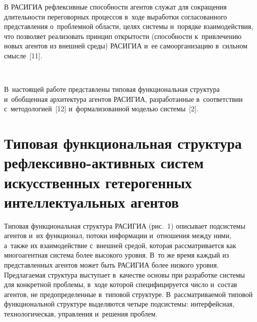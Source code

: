 \begin{multicols}{2}
{}
  
  В РАСИГИА рефлексивные способности агентов служат для сокращения 
дли\-тель\-ности переговорных процессов в~ходе выработки согласованного 
пред\-став\-ле\-ния о~проб\-лем\-ной об\-ласти, целях сис\-те\-мы и~порядке 
взаимодействия, что поз\-во\-ля\-ет реализовать принцип от\-кры\-тости (способности 
к~привлечению новых агентов из внеш\-ней среды) \mbox{РАСИГИА} и~ее 
самоорганизацию в~силь\-ном смыс\-ле~[11]. 

\begin{figure*}[b] %
\vspace*{-2pt}
  \begin{center}
 \mbox{%
 \epsfxsize=162.026mm 
 }
\end{center}
\vspace*{-9pt}
\end{figure*}


В~на\-сто\-ящей работе представлены 
типовая функциональная структура и~обобщенная архитектура агентов 
\mbox{РАСИГИА}, разработанные в~соответствии с~методологией~[12] 
и~формализованной моделью сис\-те\-мы~[2].
    
    \section{Типовая функциональная структура  
рефлексивно-активных систем искусственных гетерогенных 
интеллектуальных агентов}
  
  Типовая функциональная структура \mbox{РАСИГИА} (рис.~1) описывает 
подсистемы агентов и~их функционал, потоки информации и~отношения между 
ними, а~также их взаимодействие с~внеш\-ней средой, которая рассматривается 
как многоагентная сис\-те\-ма более высокого уровня. В~то же время каж\-дый из 
пред\-став\-лен\-ных агентов может быть \mbox{РАСИГИА} более низкого уровня. 
Пред\-ла\-га\-емая структура выступает в~качестве осно\-вы при разработке сис\-те\-мы 
для конкретной проб\-ле\-мы, в~ходе которой специфицируется чис\-ло и~со\-став 
агентов, не предопределенные в~типовой структуре. В~рас\-смат\-ри\-ва\-емой 
типовой функциональной структуре выделяются четыре под\-сис\-те\-мы: 
интерфейсная, технологическая, управ\-ле\-ния и~решения проб\-лем. 
  



\end{multicols}
